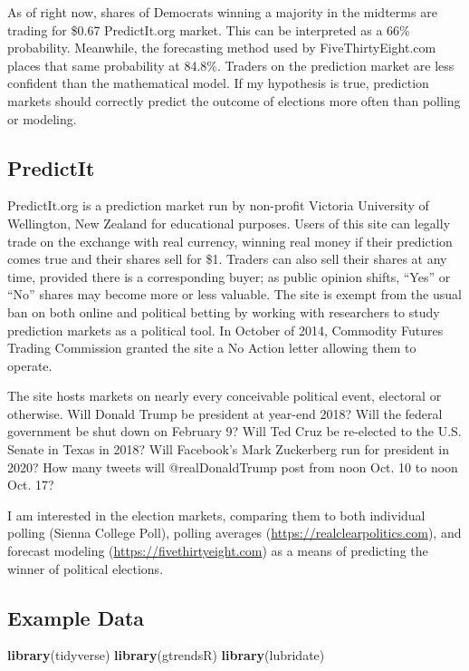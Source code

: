 \documentclass[]{article}
\newenvironment{Shaded}{\begin{snugshade}}{\end{snugshade}}
\newcommand{\KeywordTok}[1]{\textcolor[rgb]{0.13,0.29,0.53}{\textbf{#1}}}
\newcommand{\NormalTok}[1]{#1}
\begin{document}
As of right now, shares of Democrats winning a majority in the midterms
are trading for \$0.67 PredictIt.org market. This can be interpreted as
a 66\% probability. Meanwhile, the forecasting method used by
FiveThirtyEight.com places that same probability at 84.8\%. Traders on
the prediction market are less confident than the mathematical model. If
my hypothesis is true, prediction markets should correctly predict the
outcome of elections more often than polling or modeling.

\subsection{PredictIt}\label{predictit}

PredictIt.org is a prediction market run by non-profit Victoria
University of Wellington, New Zealand for educational purposes. Users of
this site can legally trade on the exchange with real currency, winning
real money if their prediction comes true and their shares sell for \$1.
Traders can also sell their shares at any time, provided there is a
corresponding buyer; as public opinion shifts, ``Yes'' or ``No'' shares
may become more or less valuable. The site is exempt from the usual ban
on both online and political betting by working with researchers to
study prediction markets as a political tool. In October of 2014,
Commodity Futures Trading Commission granted the site a No Action letter
allowing them to operate.

The site hosts markets on nearly every conceivable political event,
electoral or otherwise. Will Donald Trump be president at year-end 2018?
Will the federal government be shut down on February 9? Will Ted Cruz be
re-elected to the U.S. Senate in Texas in 2018? Will Facebook's Mark
Zuckerberg run for president in 2020? How many tweets will
@realDonaldTrump post from noon Oct. 10 to noon Oct. 17?

I am interested in the election markets, comparing them to both
individual polling (Sienna College Poll), polling averages
(\url{https://realclearpolitics.com}), and forecast modeling
(\url{https://fivethirtyeight.com}) as a means of predicting the winner
of political elections.

\subsection{Example Data}\label{example-data}

\begin{Shaded}
\begin{Highlighting}[]
\KeywordTok{library}\NormalTok{(tidyverse)}
\KeywordTok{library}\NormalTok{(gtrendsR)}
\KeywordTok{library}\NormalTok{(lubridate)}
\end{Highlighting}
\end{Shaded}
\end{document}
